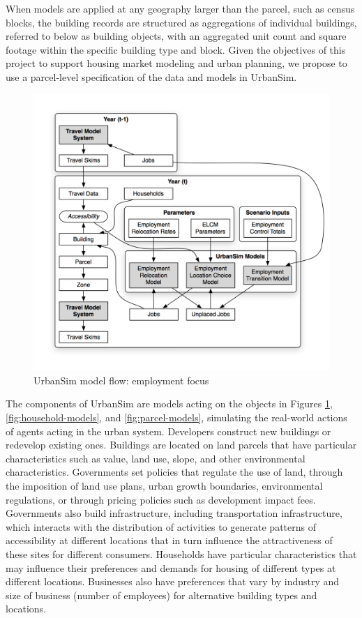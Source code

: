 When models are applied at any geography larger than the parcel, such as census blocks, the building records are structured as aggregations of individual buildings, referred to below as building objects, with an aggregated unit count and square footage within the specific building type and block. Given the objectives of this project to support housing market modeling and urban planning, we propose to use a parcel-level specification of the data and models in UrbanSim. 


\begin{figure}[htb]
    \center
    \includegraphics[width=\textwidth]{graphics/ParcelEmploymentModel.png}
    \caption{UrbanSim model flow: employment focus}
    \label{fig:employment-models}
\end{figure}

The components of UrbanSim are models acting on the objects in Figures \ref{fig:employment-models}, \ref{fig:household-models}, and \ref{fig:parcel-models}, simulating the real-world actions of agents acting in the urban system. Developers construct new buildings or redevelop existing ones. Buildings are located on land parcels that have particular characteristics such as value, land use, slope, and other environmental characteristics. Governments set policies that regulate the use of land, through the imposition of land use plans, urban growth boundaries, environmental regulations, or through pricing policies such as development impact fees. Governments also build infrastructure, including transportation infrastructure, which interacts with the distribution of activities to generate patterns of accessibility at different locations that in turn influence the attractiveness of these sites for different consumers. Households have particular characteristics that may influence their preferences and demands for housing of different types at different locations. Businesses also have preferences that vary by industry and size of business (number of employees) for alternative building types and locations.

